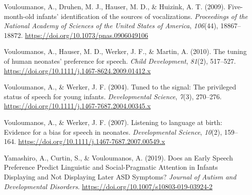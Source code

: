 \documentclass[
  man]{apa6}
\begin{document}
\leavevmode\hypertarget{ref-vouloumanos_five-month-old_2009}{}%
Vouloumanos, A., Druhen, M. J., Hauser, M. D., \& Huizink, A. T. (2009). Five-month-old infants' identification of the sources of vocalizations. \emph{Proceedings of the National Academy of Sciences of the United States of America}, \emph{106}(44), 18867--18872. \url{https://doi.org/10.1073/pnas.0906049106}

\leavevmode\hypertarget{ref-vouloumanos_tuning_2010}{}%
Vouloumanos, A., Hauser, M. D., Werker, J. F., \& Martin, A. (2010). The tuning of human neonates' preference for speech. \emph{Child Development}, \emph{81}(2), 517--527. \url{https://doi.org/10.1111/j.1467-8624.2009.01412.x}

\leavevmode\hypertarget{ref-vouloumanos_tuned_2004}{}%
Vouloumanos, A., \& Werker, J. F. (2004). Tuned to the signal: The privileged status of speech for young infants. \emph{Developmental Science}, \emph{7}(3), 270--276. \url{https://doi.org/10.1111/j.1467-7687.2004.00345.x}

\leavevmode\hypertarget{ref-vouloumanos_listening_2007}{}%
Vouloumanos, A., \& Werker, J. F. (2007). Listening to language at birth: Evidence for a bias for speech in neonates. \emph{Developmental Science}, \emph{10}(2), 159--164. \url{https://doi.org/10.1111/j.1467-7687.2007.00549.x}

\leavevmode\hypertarget{ref-yamashiro_does_2019}{}%
Yamashiro, A., Curtin, S., \& Vouloumanos, A. (2019). Does an Early Speech Preference Predict Linguistic and Social-Pragmatic Attention in Infants Displaying and Not Displaying Later ASD Symptoms? \emph{Journal of Autism and Developmental Disorders}. \url{https://doi.org/10.1007/s10803-019-03924-2}

\endgroup
\end{document}
